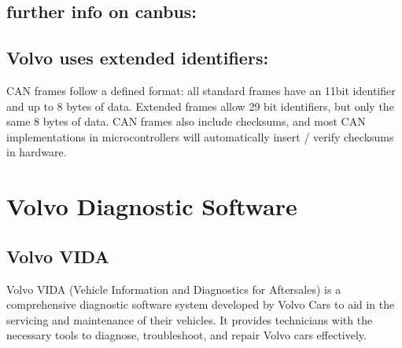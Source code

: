 \documentclass[letterpaper,10pt,english]{sphinxmanual}
\begin{document}
\section{further info on canbus:}
\label{\detokenize{canbus/webpage:further-info-on-canbus}}\label{\detokenize{canbus/webpage::doc}}

\section{Volvo uses extended identifiers:}
\label{\detokenize{canbus/webpage:volvo-uses-extended-identifiers}}
\sphinxAtStartPar
CAN frames follow a defined format: all standard frames have an 11\sphinxhyphen{}bit
identifier and up to 8 bytes of data. Extended frames allow 29 bit identifiers,
but only the same 8 bytes of data. CAN frames also include checksums, and most
CAN implementations in microcontrollers will automatically insert / verify
checksums in hardware.

\noindent{}

\noindent{}

\noindent{}


\chapter{Volvo Diagnostic Software}
\label{\detokenize{software/index:volvo-diagnostic-software}}\label{\detokenize{software/index::doc}}

\section{Volvo VIDA}
\label{\detokenize{software/vida:volvo-vida}}\label{\detokenize{software/vida::doc}}
\sphinxAtStartPar
Volvo VIDA (Vehicle Information and Diagnostics for Aftersales) is a comprehensive diagnostic software system developed by Volvo Cars to aid in the servicing and maintenance of their vehicles. It provides technicians with the necessary tools to diagnose, troubleshoot, and repair Volvo cars effectively.
\end{document}
